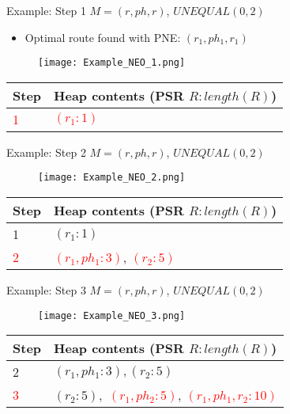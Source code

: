 \begin{frame}{Example: Step 1}
	$M = (r, ph, r)$, $UNEQUAL(0, 2)$
	
	\begin{itemize}
		\item Optimal route found with PNE: $(r_1, ph_1, r_1)$
	\end{itemize}
	
	\begin{figure}[h]
		\texttt{[image: Example\_NEO\_1.png]}
	\end{figure}
	
	\begin{table}[h]
		\centering
		\begin{tabular}{ |l|p{10cm}| } 
			\hline
			Step & Heap contents (PSR $R : length(R)$) \\
			\hline
			\textcolor{red}{1} & \textcolor{red}{$(r_1 : 1)$} \\ 
			\hline
		\end{tabular}
	\end{table}

\end{frame}

\begin{frame}{Example: Step 2}
	$M = (r, ph, r)$, $UNEQUAL(0, 2)$
	
	\begin{figure}[h]
		\texttt{[image: Example\_NEO\_2.png]}
	\end{figure}
	
	\begin{table}[h]
		\centering
		\begin{tabular}{ |l|p{10cm}| } 
			\hline
			Step & Heap contents (PSR $R : length(R)$) \\
			\hline
			1 & $(r_1 : 1)$ \\ 
			\hline
			\textcolor{red}{2} & \textcolor{red}{$(r_1, ph_1 : 3)$}, \textcolor{red}{$(r_2 : 5)$} \\ 
			\hline
		\end{tabular}
	\end{table}

\end{frame}

\begin{frame}{Example: Step 3}
	$M = (r, ph, r)$, $UNEQUAL(0, 2)$
	
	\begin{figure}[h]
		\texttt{[image: Example\_NEO\_3.png]}
	\end{figure}
	
	\begin{table}[h]
		\centering
		\begin{tabular}{ |l|p{10cm}| } 
			\hline
			Step & Heap contents (PSR $R : length(R)$) \\
			\hline
			2 & $(r_1, ph_1 : 3), (r_2 : 5)$ \\ 
			\hline
			\textcolor{red}{3} & $(r_2 : 5), $ \textcolor{red}{$(r_1, ph_2 : 5)$}, \textcolor{red}{$(r_1, ph_1, r_2 : 10)$} \\
			\hline 
		\end{tabular}
	\end{table}

\end{frame}

